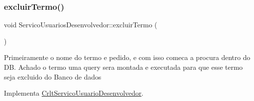 \subsubsection{\texorpdfstring{excluir\+Termo()}{excluirTermo()}}
{\footnotesize\ttfamily void Servico\+Usuarios\+Desenvolvedor\+::excluir\+Termo (\begin{DoxyParamCaption}{ }\end{DoxyParamCaption})\hspace{0.3cm}{\ttfamily [virtual]}}

Primeiramente o nome do termo e pedido, e com isso comeca a procura dentro do DB. Achado o termo uma query sera montada e executada para que esse termo seja excluido do Banco de dados

Implementa \mbox{\hyperlink{class_crlt_servico_usuario_desenvolvedor_a95825708aeed4c1f6a5829ad4bd29673}{Crlt\+Servico\+Usuario\+Desenvolvedor}}.


